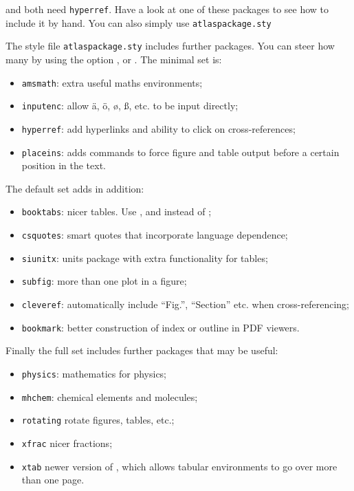  and  both need \texttt{hyperref}. 
Have a look at one of these packages to see how to include it by hand.
You can also simply use \texttt{atlaspackage.sty}

The style file \texttt{atlaspackage.sty} includes further packages.
You can steer how many by using the option ,  or .
The minimal set is:
\begin{itemize}\setlength{\parskip}{0pt}\setlength{\itemsep}{0pt}
\item \texttt{amsmath}: extra useful maths environments;
\item \texttt{inputenc}: allow ä, ö, ø, ß, etc. to be input directly;
\item \texttt{hyperref}: add hyperlinks and ability to click on cross-references;
\item \texttt{placeins}: adds commands to force figure and table output before a certain position in the text.
\end{itemize}

The default set adds in addition:
\begin{itemize}\setlength{\parskip}{0pt}\setlength{\itemsep}{0pt}
\item \texttt{booktabs}: nicer tables. Use ,  and  instead of ;
\item \texttt{csquotes}: smart quotes that incorporate language dependence;
\item \texttt{siunitx}: units package with extra functionality for tables;
\item \texttt{subfig}: more than one plot in a figure;
\item \texttt{cleveref}: automatically include \enquote{Fig.}, \enquote{Section} etc. when cross-referencing;
\item \texttt{bookmark}: better construction of index or outline in PDF viewers.
\end{itemize}

Finally the full set includes further packages that may be useful:
\begin{itemize}\setlength{\parskip}{0pt}\setlength{\itemsep}{0pt}
\item \texttt{physics}: mathematics for physics;
\item \texttt{mhchem}: chemical elements and molecules;
\item \texttt{rotating} rotate figures, tables, etc.;
\item \texttt{xfrac} nicer fractions;
\item \texttt{xtab} newer version of , which allows tabular environments to go over more than one page.
\end{itemize}

